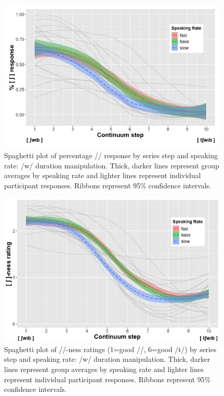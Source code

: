 \begin{figure}[htpb]
\centering
\includegraphics[scale=.5]{figures/exp2-percen.jpeg}
\caption{\label{fig:exp2-response-function}Spaghetti plot of percentage /\textesh/ response by series step and speaking rate: /w/ duration manipulation. Thick, darker lines represent group averages by speaking rate and lighter lines represent individual participant responses. Ribbons represent 95\% confidence intervals.}
\end{figure}

\begin{figure}
\centering
\includegraphics[scale=.5]{figures/exp2-eshness-rating.jpeg}
\caption{\label{fig:exp2-eshness-rating}Spaghetti plot of /\textesh/-ness ratings (1=good /\textesh/, 6=good /t\textesh/) by series step and speaking rate: /w/ duration manipulation. Thick, darker lines represent group averages by speaking rate and lighter lines represent individual participant responses. Ribbons represent 95\% confidence intervals.}
\end{figure}

